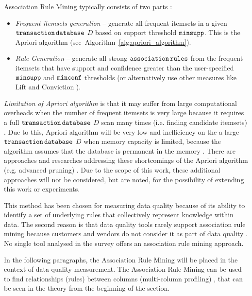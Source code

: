 		Association Rule Mining typically consists of two parts \cite{Zhang2002}\cite{Agarwal1994}:
		
		\begin{itemize}
			\item \emph{Frequent itemsets generation} -- generate all frequent
itemsets in a given ${\operatorname{\mathtt{transaction}}}\,{\operatorname{\mathtt{database}}}$ $D$ based on support threshold ${\operatorname{\mathtt{minsupp}}}$. This is the Apriori algorithm (see~Algorithm~\ref{alg:apriori_algorithm}).
			\item \emph{Rule Generation} -- generate all strong ${\operatorname{\mathtt{association}}}\,{\operatorname{\mathtt{rules}}}$ from the frequent itemsets that have support and confidence greater than the user-specified ${\operatorname{\mathtt{minsupp}}}$ and ${\operatorname{\mathtt{minconf}}}$ thresholds (or alternatively use other measures like Lift \cite{Malik2018} and Conviction \cite{Hahsler2020}). 
		\end{itemize}

		\emph{Limitation of Apriori algorithm} is that it may suffer from large computational overheads when the number of frequent itemsets is very large because it requires a full ${\operatorname{\mathtt{transaction}}}\,{\operatorname{\mathtt{database}}}$ $D$ scan many times (i.e. finding candidate itemsets) \cite{Zhang2002}\cite{AlMaolegi2014}. Due to this, Apriori algorithm will be very low and inefficiency on the a large ${\operatorname{\mathtt{transaction}}}\,{\operatorname{\mathtt{database}}}$ $D$ when memory capacity is limited, because the algorithm assumes that the database is permanent in the memory \cite{AlMaolegi2014}. There are approaches and researches addressing these shortcomings of the Apriori algorithm (e.g. advanced pruning) \cite{Zhang2002}\cite{AlMaolegi2014}. Due to the scope of this work, these additional approaches will not be considered, but are noted, for the possibility of extending this work or experiments.		
							
		This method has been chosen for measuring data quality because of its ability to identify a set of underlying rules that collectively represent knowledge within data. The second reason is that data quality tools rarely support association rule mining because customers and vendors do not consider it as part of data quality \cite{Ehrlinger2019}. No single tool analysed in the survey \cite{Ehrlinger2019} offers an association rule mining approach.
		
		In the following paragraphs, the Association Rule Mining will be placed in the context of data quality measurement. The Association Rule Mining can be used to find relationships (rules) between columns (multi-column profiling) \cite{Ehrlinger2019}, that can be seen in the theory from the beginning of the section.
		
